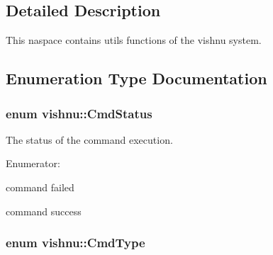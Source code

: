\subsection{Detailed Description}
This naspace contains utils functions of the vishnu system. 

\subsection{Enumeration Type Documentation}
\hypertarget{namespacevishnu_a5513f86dabac3cd717c915498a7679ad}{
\subsubsection[{CmdStatus}]{\setlength{\rightskip}{0pt plus 5cm}enum {\bf vishnu::CmdStatus}}}
\label{namespacevishnu_a5513f86dabac3cd717c915498a7679ad}


The status of the command execution. 

\begin{Desc}
\item[Enumerator: ]\par
\begin{description}
\item[{\em 
\hypertarget{namespacevishnu_a5513f86dabac3cd717c915498a7679adae7dab65b7ae704dfe53ba3db119c0777}{
CMDFAILED}
\label{namespacevishnu_a5513f86dabac3cd717c915498a7679adae7dab65b7ae704dfe53ba3db119c0777}
}]command failed \item[{\em 
\hypertarget{namespacevishnu_a5513f86dabac3cd717c915498a7679ada5a52e3ba3082e971180e246724851e1e}{
CMDSUCCESS}
\label{namespacevishnu_a5513f86dabac3cd717c915498a7679ada5a52e3ba3082e971180e246724851e1e}
}]command success \end{description}
\end{Desc}

\hypertarget{namespacevishnu_a89462b396eca68c9c1a94a06d2f39532}{
\subsubsection[{CmdType}]{\setlength{\rightskip}{0pt plus 5cm}enum {\bf vishnu::CmdType}}}
\label{namespacevishnu_a89462b396eca68c9c1a94a06d2f39532}


